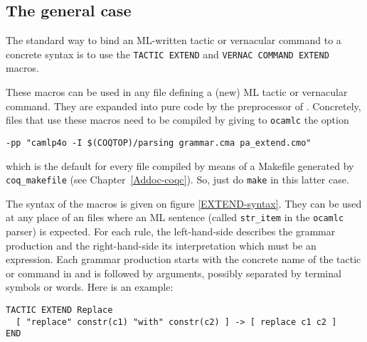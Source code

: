 \subsection{The general case}

The standard way to bind an ML-written tactic or vernacular command to
a concrete {\Coq} syntax is to use the
\verb=TACTIC EXTEND= and \verb=VERNAC COMMAND EXTEND= macros.

These macros can be used in any {\ocaml} file defining a (new) ML tactic
or vernacular command. They are expanded into pure {\ocaml} code by
the {\camlpppp} preprocessor of {\ocaml}. Concretely, files that use
these macros need to be compiled by giving to {\tt ocamlc} the option 

\verb=-pp "camlp4o -I $(COQTOP)/parsing grammar.cma pa_extend.cmo"=

\noindent which is the default for every file compiled by means of a Makefile
generated by {\tt coq\_makefile} (see Chapter~\ref{Addoc-coqc}). So,
just do \verb=make= in this latter case.

The syntax of the macros is given on figure
\ref{EXTEND-syntax}. They can be used at any place of an {\ocaml}
files where an ML sentence (called \verb=str_item= in the {\tt ocamlc}
parser) is expected. For each rule, the left-hand-side describes the
grammar production and the right-hand-side its interpretation which
must be an {\ocaml} expression. Each grammar production starts with
the concrete name of the tactic or command in {\Coq} and is followed
by arguments, possibly separated by terminal symbols or words.
Here is an example:

\begin{verbatim}
TACTIC EXTEND Replace
  [ "replace" constr(c1) "with" constr(c2) ] -> [ replace c1 c2 ]
END
\end{verbatim}

\newcommand{\grule}{\textrm{\textsl{rule}}}
\newcommand{\stritem}{\textrm{\textsl{ocaml\_str\_item}}}
\newcommand{\camlexpr}{\textrm{\textsl{ocaml\_expr}}}
\newcommand{\arginfo}{\textrm{\textsl{argument\_infos}}}
\newcommand{\lident}{\textrm{\textsl{lower\_ident}}}
\newcommand{\argument}{\textrm{\textsl{argument}}}
\newcommand{\entry}{\textrm{\textsl{entry}}}
\newcommand{\argtype}{\textrm{\textsl{argtype}}}

